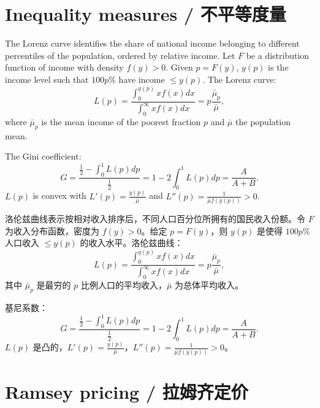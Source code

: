 \section{Inequality measures / 不平等度量}

\begin{original}
The Lorenz curve identifies the share of national income belonging to different percentiles of the population, ordered by relative income. Let $F$ be a distribution function of income with density $f(y) > 0$. Given $p = F(y)$, $y(p)$ is the income level such that $100p\%$ have income $\le y(p)$. The Lorenz curve:
\[
L(p) = \frac{\int_0^{y(p)} x f(x)dx}{\int_0^{\infty} x f(x)dx} = p\frac{\bar{\mu}_p}{\bar{\mu}},
\]
where $\bar{\mu}_p$ is the mean income of the poorest fraction $p$ and $\bar{\mu}$ the population mean.

The Gini coefficient:
\[
G = \frac{\frac{1}{2} - \int_0^1 L(p)dp}{\frac{1}{2}} = 1 - 2\int_0^1 L(p)dp = \frac{A}{A+B}.
\]
$L(p)$ is convex with $L'(p) = \frac{y(p)}{\bar{\mu}}$ and $L''(p) = \frac{1}{\bar{\mu} f(y(p))} > 0$.
\end{original}
\begin{translation}
洛伦兹曲线表示按相对收入排序后，不同人口百分位所拥有的国民收入份额。令 $F$ 为收入分布函数，密度为 $f(y) > 0$。给定 $p = F(y)$，则 $y(p)$ 是使得 $100p\%$ 人口收入 $\le y(p)$ 的收入水平。洛伦兹曲线：
\[
L(p) = \frac{\int_0^{y(p)} x f(x)dx}{\int_0^{\infty} x f(x)dx} = p\frac{\bar{\mu}_p}{\bar{\mu}},
\]
其中 $\bar{\mu}_p$ 是最穷的 $p$ 比例人口的平均收入，$\bar{\mu}$ 为总体平均收入。

基尼系数：
\[
G = \frac{\frac{1}{2} - \int_0^1 L(p)dp}{\frac{1}{2}} = 1 - 2\int_0^1 L(p)dp = \frac{A}{A+B}.
\]
$L(p)$ 是凸的，$L'(p) = \frac{y(p)}{\bar{\mu}}$，$L''(p) = \frac{1}{\bar{\mu} f(y(p))} > 0$。
\end{translation}

\section{Ramsey pricing / 拉姆齐定价}

